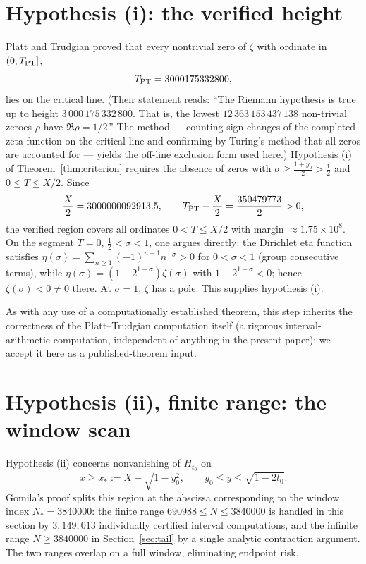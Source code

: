 \documentclass[11pt]{article}
\theoremstyle{definition}
\begin{document}
\section{Hypothesis (i): the verified height}\label{sec:hypi}

Platt and Trudgian \cite[Theorem~1]{PlattTrudgian} proved that every
nontrivial zero of $\zeta$ with ordinate in $(0,T_{\rm PT}]$,
\[
T_{\rm PT}=3000175332800,
\]
lies on the critical line. (Their statement reads: ``The Riemann
hypothesis is true up to height $3\,000\,175\,332\,800$. That is, the
lowest $12\,363\,153\,437\,138$ non-trivial zeroes $\rho$ have
$\Re\rho=1/2$.'' The method --- counting sign changes of the completed
zeta function on the critical line and confirming by Turing's method
that all zeros are accounted for --- yields the off-line exclusion
form used here.) Hypothesis (i) of
Theorem~\ref{thm:criterion} requires the absence of zeros with
$\sigma\ge\frac{1+y_0}2>\frac12$ and $0\le T\le X/2$. Since
\[
\frac X2=3000000092913.5,
\qquad
T_{\rm PT}-\frac X2=\frac{350479773}{2}>0,
\]
the verified region covers all ordinates $0<T\le X/2$ with margin
$\approx1.75\times10^8$. On the segment $T=0$, $\tfrac12<\sigma<1$,
one argues directly: the Dirichlet eta function satisfies
$\eta(\sigma)=\sum_{n\ge1}(-1)^{n-1}n^{-\sigma}>0$ for
$0<\sigma<1$ (group consecutive terms), while
$\eta(\sigma)=(1-2^{1-\sigma})\zeta(\sigma)$ with
$1-2^{1-\sigma}<0$; hence $\zeta(\sigma)<0\ne0$ there. At $\sigma=1$,
$\zeta$ has a pole. This supplies hypothesis (i).

As with any use of a computationally established theorem, this step
inherits the correctness of the Platt--Trudgian computation itself (a
rigorous interval-arithmetic computation, independent of anything in
the present paper); we accept it here as a published-theorem
input.

\section{Hypothesis (ii), finite range: the window scan}\label{sec:finite}

Hypothesis (ii) concerns nonvanishing of $H_{t_0}$ on
\begin{equation}\label{eq:hypiiregion}
x\ge x_*:=X+\sqrt{1-y_0^2},
\qquad
y_0\le y\le\sqrt{1-2t_0}.
\end{equation}
Gomila's proof splits this region at the abscissa corresponding to
the window index $N_*=3840000$: the finite range
$690988\le N\le3840000$ is handled in this section by
$3{,}149{,}013$ individually certified interval computations, and
the infinite range $N\ge3840000$ in Section~\ref{sec:tail} by a
single analytic contraction argument. The two ranges overlap on a
full window, eliminating endpoint risk.
\end{document}
